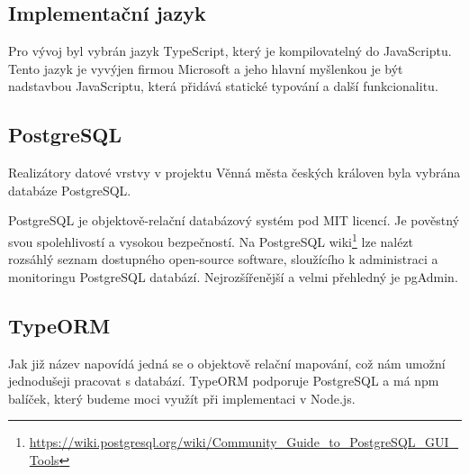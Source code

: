 \documentclass[thesis=B,czech]{FITthesis}[2012/06/26]
\begin{document}
        \subsection{Implementační jazyk}
            Pro vývoj byl vybrán jazyk TypeScript, který je kompilovatelný do JavaScriptu. Tento jazyk je vyvýjen firmou Microsoft a jeho hlavní myšlenkou je být nadstavbou JavaScriptu, která přidává statické typování a další funkcionalitu.
        \subsection{PostgreSQL}
            Realizátory datové vrstvy v projektu Věnná města českých královen byla vybrána databáze PostgreSQL.
            
            PostgreSQL je objektově-relační databázový systém pod MIT licencí. Je pověstný svou spolehlivostí a vysokou bezpečností. Na PostgreSQL wiki\footnote{\url{https://wiki.postgresql.org/wiki/Community_Guide_to_PostgreSQL_GUI_Tools}} lze nalézt rozsáhlý seznam dostupného open-source software, sloužícího k administraci a monitoringu PostgreSQL databází. Nejrozšířenější a velmi přehledný je pgAdmin.
        \subsection{TypeORM}
            Jak již název napovídá jedná se o objektově relační mapování, což nám umožní jednodušeji pracovat s databází. TypeORM podporuje PostgreSQL a má npm balíček, který budeme moci využít při implementaci v Node.js.
            \cite{typeorm}
\end{document}
